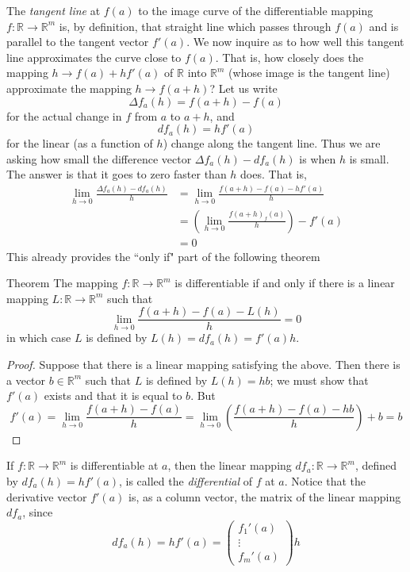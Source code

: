 The \emph{tangent line} at \( f(a) \) to the image curve of the differentiable mapping \( f: \mathbb{R} \rightarrow \mathbb{R}^m \) is, by definition, that straight line which passes through \( f(a) \) and is parallel to the tangent vector \( f'(a) \). We now inquire as to how well this tangent line approximates the curve close to \( f(a) \). That is, how closely does the mapping \( h \rightarrow f(a)+hf'(a) \) of \( \mathbb{R} \) into \( \mathbb{R}^m \) (whose image is the tangent line) approximate the mapping \( h \rightarrow f(a+h) \)? Let us write
\[
\Delta f_a(h) = f(a+h)-f(a)
\]
for the actual change in \( f \) from \( a \) to \( a+h \), and 
\[
df_a(h) = hf'(a)
\]
for the linear (as a function of \( h \)) change along the tangent line. Thus we are asking how small the difference vector \( \Delta f_a(h)-df_a(h) \) is when \( h \) is small. The answer is that it goes to zero faster than \( h \) does. That is,
\begin{align*}
    \lim_{h \rightarrow 0} \frac{\Delta f_a(h) - df_a(h)}{h} &= \lim_{h \rightarrow 0} \frac{f(a+h)-f(a)-hf'(a)}{h} \\
    &= \left(\lim_{h \rightarrow 0} \frac{f(a+h)_f(a)}{h} \right)-f'(a) \\
    &= 0
\end{align*}
This already provides the ``only if" part of the following theorem
\begin{thm}{Theorem}
The mapping \( f: \mathbb{R} \rightarrow \mathbb{R}^m \) is differentiable if and only if there is a linear mapping \( L: \mathbb{R} \rightarrow \mathbb{R}^m \) such that
\[
\lim_{h \rightarrow 0} \frac{f(a+h)-f(a)-L(h)}{h} = 0
\]
in which case \( L \) is defined by \( L(h) = df_a(h) = f'(a)h \).
\end{thm}
\begin{proof}
Suppose that there is a linear mapping satisfying the above. Then there is a vector \( b \in \mathbb{R}^m \) such that \( L \) is defined by \( L(h) = hb \); we must show that \( f'(a) \) exists and that it is equal to \( b \). But
\[
f'(a) = \lim_{h \rightarrow 0} \frac{f(a+h)-f(a)}{h} = \lim_{h \rightarrow 0} \left( \frac{f(a+h)-f(a)-hb}{h} \right)+b = b
\]
\end{proof}
If \( f: \mathbb{R} \rightarrow \mathbb{R}^m \) is differentiable at \( a \), then the linear mapping \( df_a: \mathbb{R} \rightarrow \mathbb{R}^m \), defined by \( df_a(h) = hf'(a) \), is called the \emph{differential} of \( f \) at \( a \). Notice that the derivative vector \( f'(a) \) is, as a column vector, the matrix of the linear mapping \( df_a \), since 
\[
df_a(h) = hf'(a) = \left( \begin{array}{c} f_1'(a) \\ \vdots \\ f_m'(a) \end{array} \right)h
\]

